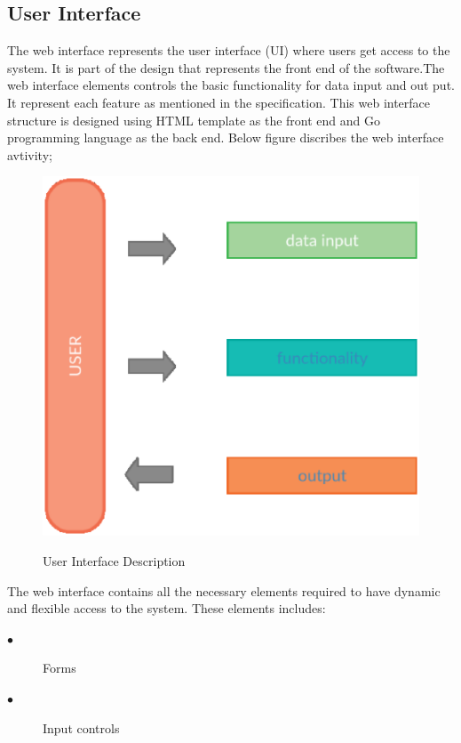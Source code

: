 \subsection{User Interface}
The web interface represents the user interface (UI) where users get access to the system. It is part of the design that represents the front end of the software.The web interface elements controls the basic functionality for data input and out put. It represent each feature as mentioned in the specification. This web interface structure is designed using  HTML template as the front end and Go programming language as the back end. Below figure discribes the web interface avtivity;
\begin{figure}[h!]
\includegraphics[width=\linewidth, scale=0.4]{userinterface.eps}
\label{fig:Web Interface Activity} 
\caption{User Interface Description}
\end{figure}
\pagebreak
 The web interface contains all the necessary elements required to have dynamic and flexible access to the system. These elements includes:
\begin{description}
  \item[$\bullet$] Forms
  \item[$\bullet$] Input controls
\end{description}
